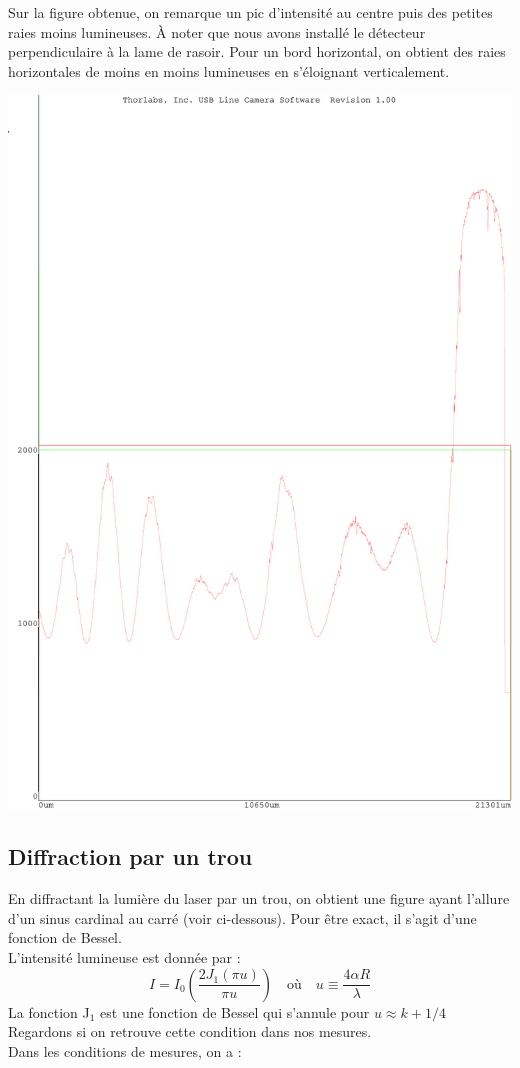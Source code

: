 \documentclass[12pt,a4paper]{article}
\begin{document}
	Sur la figure obtenue, on remarque un pic d'intensité au centre puis des petites raies moins lumineuses. À noter que nous avons installé le détecteur perpendiculaire à la lame de rasoir. Pour un bord horizontal, on obtient des raies horizontales de moins en moins lumineuses en s'éloignant verticalement. 
	\begin{center}
		\includegraphics[scale=0.45]{res/rasoir}
	\end{center}
	\subsection{Diffraction par un trou}
	En diffractant la lumière du laser par un trou, on obtient une figure ayant l'allure d'un sinus cardinal au carré (voir ci-dessous). Pour être exact, il s'agit d'une fonction de Bessel.\\
	L'intensité lumineuse est donnée par :
	$$I=I_0 \left( \dfrac{2J_1(\pi u)}{\pi u}\right) \quad \text{où}\quad u\equiv\dfrac{4\alpha R}{\lambda}$$
	La fonction J$_1$ est une fonction de Bessel qui s'annule pour $u\approx k+1/4$
	Regardons si on retrouve cette condition dans nos mesures.\\
	Dans les conditions de mesures, on a : \\
	
\end{document}
